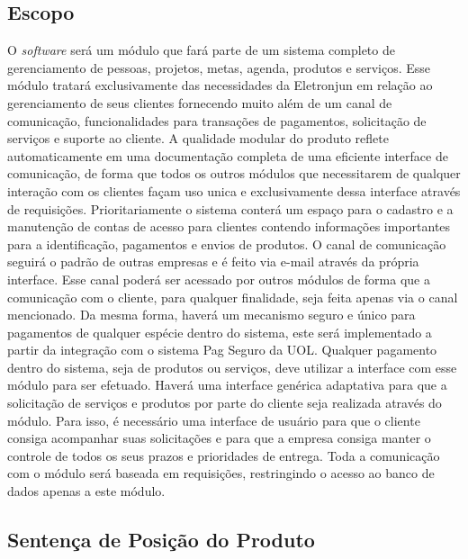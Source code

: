     \subsection{Escopo}
      O \textit{software} será um módulo que fará parte de um sistema completo de gerenciamento de pessoas, projetos, metas, agenda, produtos e serviços. Esse módulo tratará exclusivamente das necessidades da Eletronjun em relação ao gerenciamento de seus clientes fornecendo muito além de um canal de comunicação, funcionalidades para transações de pagamentos, solicitação de serviços e suporte ao cliente.
      A qualidade modular do produto reflete automaticamente em uma documentação completa de uma eficiente interface de comunicação, de forma que todos os outros módulos que necessitarem de qualquer interação com os clientes façam uso unica e exclusivamente dessa interface através de requisições.
      Prioritariamente o sistema conterá um espaço para o cadastro e a manutenção de contas de acesso para clientes contendo informações importantes para a identificação, pagamentos e envios de produtos.
      O canal de comunicação seguirá o padrão de outras empresas e é feito via e-mail através da própria interface. Esse canal poderá ser acessado por outros módulos de forma que a comunicação com o cliente, para qualquer finalidade, seja feita apenas via o canal mencionado. Da mesma forma, haverá um mecanismo seguro e único para pagamentos de qualquer espécie dentro do sistema, este será implementado a partir da integração com o sistema Pag Seguro da UOL. Qualquer pagamento dentro do sistema, seja de produtos ou serviços, deve utilizar a interface com esse módulo para ser efetuado.
      Haverá uma interface genérica adaptativa para que a solicitação de serviços e produtos por parte do cliente seja realizada através do módulo. Para isso, é necessário uma interface de usuário para que o cliente consiga acompanhar suas solicitações e para que a empresa consiga manter o controle de todos os seus prazos e prioridades de entrega.
      Toda a comunicação com o módulo será baseada em requisições, restringindo o acesso ao banco de dados apenas a este módulo. 
    \subsection{Sentença de Posição do Produto} 

